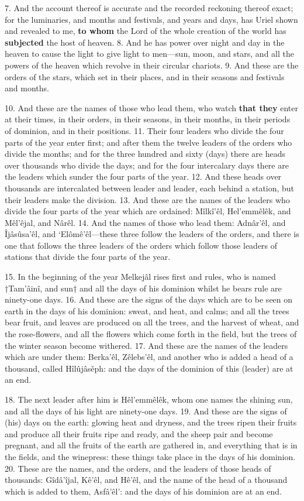 7. And the account thereof is accurate and the
recorded reckoning thereof exact; for the luminaries,
and months and festivals, and years and days, has
Uriel shown and revealed to me, \textbf{to whom} the Lord
of the whole creation of the world has \textbf{subjected} the
host of heaven. 8. And he has power over night and
day in the heaven to cause the light to give light to
men—sun, moon, and stars, and all the powers of the
heaven which revolve in their circular chariots.
9. And these are the orders of the stars, which set in
their places, and in their seasons and festivals and
months.

10. And these are the names of those who lead
them, who watch \textbf{that they} enter at their times, in
their orders, in their seasons, in their months, in their
periods of dominion, and in their positions. 11. Their
four leaders who divide the four parts of the year
enter first; and after them the twelve leaders of the
orders who divide the months; and for the three
hundred and sixty (days) there are heads over thousands
who divide the days; and for the four intercalary
days there are the leaders which sunder the four parts
of the year. 12. And these heads over thousands are
intercalated between leader and leader, each behind
a station, but their leaders make the division. 13. And
these are the names of the leaders who divide the
four parts of the year which are ordained: Mîlkî’êl,
Hel’emmêlêk, and Mêl’êjal, and Nârêl. 14. And
the names of those who lead them: Adnâr’êl, and
Îjâsûsa’êl, and ‘Elômê’êl—these three follow the
leaders of the orders, and there is one that follows the
three leaders of the orders which follow those leaders
of stations that divide the four parts of the year.

15. In the beginning of the year Melkejâl rises first
and rules, who is named †Tam’âinî, and sun† and
all the days of his dominion whilst he bears rule are
ninety-one days. 16. And these are the signs of the
days which are to be seen on earth in the days of
his dominion: sweat, and heat, and calms; and all
the trees bear fruit, and leaves are produced on all
the trees, and the harvest of wheat, and the rose-flowers,
and all the flowers which come forth in the
field, but the trees of the winter season become
withered. 17. And these are the names of the
leaders which are under them: Berka’êl, Zêlebs’êl,
and another who is added a head of a thousand, called
Hîlûjâsěph: and the days of the dominion of this
(leader) are at an end.

18. The next leader after him is Hêl’emmêlêk,
whom one names the shining sun, and all the days of
his light are ninety-one days. 19. And these are
the signs of (his) days on the earth: glowing heat and
dryness, and the trees ripen their fruits and produce
all their fruits ripe and ready, and the sheep pair
and become pregnant, and all the fruits of the earth
are gathered in, and everything that is in the fields,
and the winepress: these things take place in the
days of his dominion. 20. These are the names,
and the orders, and the leaders of those heads of
thousands: Gîdâ’îjal, Kê’êl, and Hê’êl, and the name
of the head of a thousand which is added to them,
Asfâ’êl’: and the days of his dominion are at an end.

